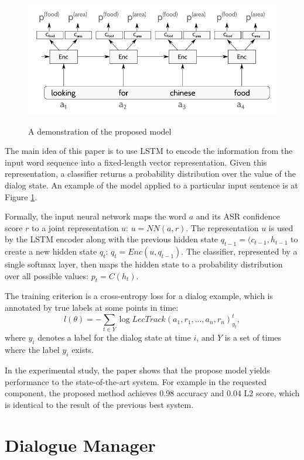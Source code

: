 \documentclass[paper=a4, fontsize=18pt]{article} %
\numberwithin{equation}{section} %
\numberwithin{figure}{section} %
\numberwithin{table}{section} %
\begin{document}
\begin{figure}[h]
  \centering
  \includegraphics[width=.7\linewidth]{11_28_dstc_ilstm.png}\\
  \caption{A demonstration of the proposed model}\label{fig:dstc_ilstm}
\end{figure}

The main idea of this paper is to use LSTM to encode the information from the input word sequence into a fixed-length vector representation. Given this representation, a classifier returns a probability distribution over the value of the dialog state. An example of the model applied to a particular input sentence is at Figure \ref{fig:dstc_ilstm}.

Formally, the input neural network maps the word $a$ and its ASR confidence score $r$ to a joint representation $u$: $u = NN(a, r)$. The representation $u$ is used by the LSTM encoder along with the previous hidden state $q_{t-1} = (c_{t-1}, h_{t-1}$ to create a new hidden state $q_t$: $q_t = Enc(u, q_{t-1})$. The classifier, represented by a single softmax layer, then maps the hidden state to a probability distribution over all possible values: $p_t = C(h_t)$.

The training criterion is a cross-entropy loss for a dialog example, which is annotated by true labels at some points in time:
$$l(\theta) = - \sum_{t \in Y} \log LecTrack(a_1, r_1, ..., a_n, r_n)_{y_t}^t,$$
where $y_i$ denotes a label for the dialog state at time $i$, and $Y$ is a set of times where the label $y_i$ exists.

In the experimental study, the paper shows that the propose model yields performance to the state-of-the-art system. For example in the requested component, the proposed method achieves 0.98 accuracy and 0.04 L2 score, which is identical to the result of the previous best system.

\section{Dialogue Manager}
\end{document}
